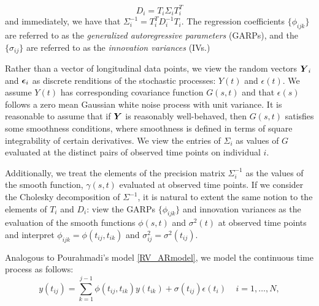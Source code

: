 \documentclass[12pt]{article}
\newcommand{\bfeps}{\mbox{\boldmath $\epsilon$}}
\newcommand{\bfY}{\mbox{\boldmath $Y$}}
\theoremstyle{definition}
\begin{document}
\begin{equation}
\nonumber
D_i = T_i \Sigma_i T_i^T
\end{equation} 
\noindent
and immediately, we have that $\Sigma_i^{-1} = T_i^T D_i^{-1} T_i$. The regression coefficients $\lbrace \phi_{ijk} \rbrace$ are referred to as the \emph{generalized autoregressive parameters} (GARPs), and the $\lbrace \sigma_{ij} \rbrace$ are referred to as the \emph{innovation variances} (IVs.) 


Rather than a vector of longitudinal data points, we view the random vectors $\bfY_i$ and $\bfeps_i$ as discrete renditions of the stochastic processes: $Y\left(t\right)$ and $\epsilon\left(t\right)$.  We assume $Y\left(t\right)$ has corresponding covariance function $G\left(s,t\right)$ and that $\epsilon\left(s\right)$ follows a zero mean Gaussian white noise process with unit variance. It is reasonable to assume that if $\bfY$ is reasonably well-behaved, then $G\left(s,t\right)$ satisfies some smoothness conditions, where smoothness is defined in terms of square integrability of certain derivatives. We view the entries of $\Sigma_i$ as values of $G$ evaluated at the distinct pairs of observed time points on individual $i$. 

Additionally, we treat the elements of the precision matrix $\Sigma_i^{-1}$ as the values of the smooth function, $\gamma\left(s,t\right)$ evaluated at observed time points. If we consider the Cholesky decomposition of $\Sigma^{-1}$, it is natural to extent the same notion to the elements of $T_i$ and $D_i$: view the GARPs $\lbrace \phi_{ijk} \rbrace$ and innovation variances as the evaluation of the smooth functions $\phi\left(s,t\right)$ and $\sigma^2\left(t\right)$ at observed time points and interpret $\phi_{ijk} = \phi\left(t_{ij},t_{ik}\right)$ and $\sigma_{ij}^2 = \sigma^2\left(t_{ij}\right)$. 

Analogous to Pourahmadi's model \eqref{RV_ARmodel}, we model the continuous time process as follows: 
\begin{equation}   
y\left(t_{ij} \right)  = \sum_{k=1}^{j-1} \phi\left(t_{ij} ,t_{ik}\right) y\left(t_{ik}\right) + \sigma\left(t_{ij}\right)\epsilon\left({t_i}\right) \;\;\;\; i=1,\dots, N, 
\label{eq:MyModel} 
\end{equation}
\end{document}
